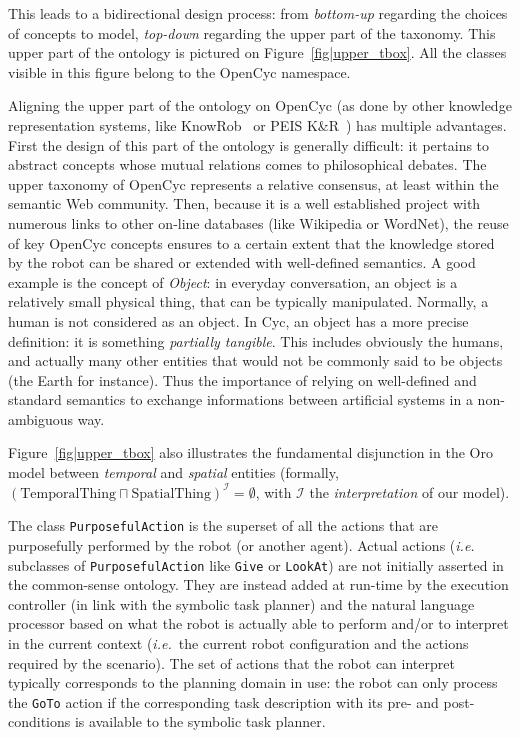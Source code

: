 \documentclass[preprint,3p,times]{elsarticle}
\newcommand{\concept}[1]{{\small \texttt{#1}}}
\newcommand{\ie}{{\textit{i.e.\ }}}
\begin{document}
This leads to a bidirectional design process: from \emph{bottom-up} regarding
the choices of concepts to model, \emph{top-down} regarding the upper part of
the taxonomy. This upper part of the ontology is pictured on
Figure~\ref{fig|upper_tbox}. All the classes visible in this figure belong to
the {\sc OpenCyc} namespace.

Aligning the upper part of the ontology on {\sc OpenCyc} (as done by other
knowledge representation systems, like {\sc KnowRob}~\cite{Tenorth2009a} or PEIS
K\&R~\cite{Daoutis2009}) has multiple advantages. First the design of this part
of the ontology is generally difficult: it pertains to abstract concepts whose
mutual relations comes to philosophical debates. The upper taxonomy of {\sc
OpenCyc} represents a relative consensus, at least within the semantic Web
community. Then, because it is a well established project with numerous links to
other on-line databases (like Wikipedia or WordNet), the reuse of key {\sc
OpenCyc} concepts ensures to a certain extent that the knowledge stored by the
robot can be shared or extended with well-defined semantics. A good example is
the concept of \emph{Object}: in everyday conversation, an object is a
relatively small physical thing, that can be typically manipulated. Normally, a
human is not considered as an object. In {\sc Cyc}, an object has a more precise
definition: it is something \emph{partially tangible}. This includes obviously
the humans, and actually many other entities that would not be commonly said to
be objects (the Earth for instance). Thus the importance of relying on
well-defined and standard semantics to exchange informations between artificial
systems in a non-ambiguous way.

Figure~\ref{fig|upper_tbox} also illustrates the fundamental disjunction
in the {\sc Oro} model between \emph{temporal} and \emph{spatial} entities (formally,
$(\text{TemporalThing} \sqcap \text{SpatialThing})^{\mathcal{I}} = \emptyset$, with
$\mathcal{I}$ the \emph{interpretation} of our model).

The class \concept{PurposefulAction} is the superset of all the actions that are
purposefully performed by the robot (or another agent). Actual actions (\ie
subclasses of \concept{PurposefulAction} like \concept{Give} or
\concept{LookAt}) are not initially asserted in the common-sense ontology. They
are instead added at run-time by the execution controller (in link with the
symbolic task planner) and the natural language processor based on what the
robot is actually able to perform and/or to interpret in the current context
(\ie the current robot configuration and the actions required by the scenario).
The set of actions that the robot can interpret typically corresponds to the
planning domain in use: the robot can only process the \concept{GoTo} action if
the corresponding task description with its pre- and post-conditions is
available to the symbolic task planner.
\end{document}
